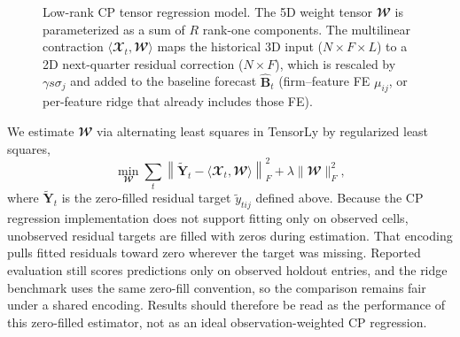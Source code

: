 \documentclass[pdflatex,sn-mathphys-num]{sn-jnl}%
\theoremstyle{thmstyleone}%
\theoremstyle{thmstyletwo}%
\theoremstyle{thmstylethree}%
\begin{document}
\begin{figure}[!htbp]
{\begin{tikzpicture}[>=stealth', node distance=1.5cm, font=\sffamily]
\end{tikzpicture}%
}%
\caption{Low-rank CP tensor regression model. The 5D weight tensor $\mathbfcal{W}$ is parameterized as a sum of $R$ rank-one components. The multilinear contraction $\langle \mathbfcal{X}_t, \mathbfcal{W} \rangle$ maps the historical 3D input ($N \times F \times L$) to a 2D next-quarter residual correction ($N \times F$), which is rescaled by $\gamma s\sigma_j$ and added to the baseline forecast $\widehat{\mathbf{B}}_t$ (firm--feature FE $\mu_{ij}$, or per-feature ridge that already includes those FE).}
\label{Fig:CP_Regression}
\end{figure}

We estimate $\mathbfcal{W}$ via alternating least squares in TensorLy \citep{kossaifi2019tensorly} by regularized least squares,
\begin{equation}
\min_{\mathbfcal{W}}
\sum_t \left\| \widetilde{\mathbf{Y}}_t - \langle \mathbfcal{X}_t, \mathbfcal{W} \rangle \right\|_F^2
+ \lambda \|\mathbfcal{W}\|_F^2,
\end{equation}
where $\widetilde{\mathbf{Y}}_t$ is the zero-filled residual target $\tilde{y}_{tij}$ defined above. Because the CP regression implementation does not support fitting only on observed cells, unobserved residual targets are filled with zeros during estimation. That encoding pulls fitted residuals toward zero wherever the target was missing. Reported evaluation still scores predictions only on observed holdout entries, and the ridge benchmark uses the same zero-fill convention, so the comparison remains fair under a shared encoding. Results should therefore be read as the performance of this zero-filled estimator, not as an ideal observation-weighted CP regression.
\end{document}
